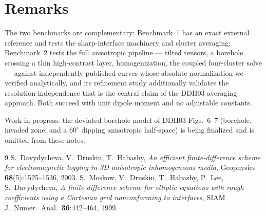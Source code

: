 \documentclass[11pt]{article}
\begin{document}
\section{Remarks}

The two benchmarks are complementary: Benchmark~1 has an exact external
reference and tests the sharp-interface machinery and cluster averaging;
Benchmark~2 tests the full anisotropic pipeline --- tilted tensors, a
borehole crossing a thin high-contrast layer, homogenization, the coupled
four-cluster solve --- against independently published curves whose absolute
normalization we verified analytically, and its refinement study
additionally validates the resolution-independence that is the central claim
of the DDH03 averaging approach. Both succeed with unit dipole moment and no
adjustable constants.

Work in progress: the deviated-borehole model of DDH03 Figs.~6--7 (borehole,
invaded zone, and a $60^\circ$ dipping anisotropic half-space) is being
finalized and is omitted from these notes.

\begin{thebibliography}{9}
 S.~Davydycheva, V.~Druskin, T.~Habashy,
\emph{An efficient finite-difference scheme for electromagnetic logging in 3D
anisotropic inhomogeneous media}, Geophysics \textbf{68}(5):1525--1536, 2003.
 S.~Moskow, V.~Druskin, T.~Habashy, P.~Lee,
S.~Davydycheva, \emph{A finite difference scheme for elliptic equations with
rough coefficients using a Cartesian grid nonconforming to interfaces},
SIAM J.\ Numer.\ Anal.\ \textbf{36}:442--464, 1999.
\end{thebibliography}
\end{document}
